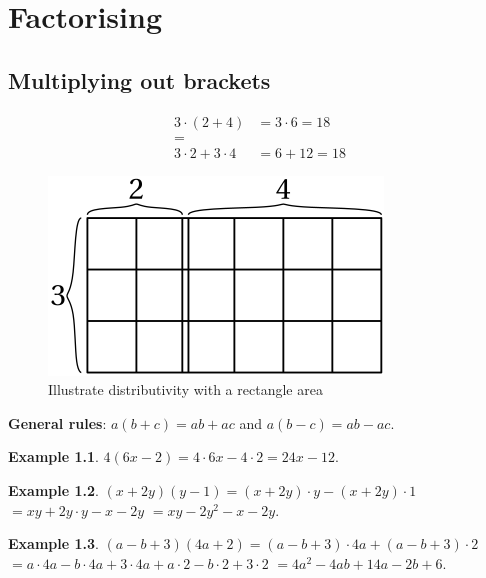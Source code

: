 \documentclass[
  12pt,
  oneside]{book}
\theoremstyle{definition}
\theoremstyle{definition}
\newtheorem{example}{Example}[chapter]
\theoremstyle{definition}
\theoremstyle{definition}
\theoremstyle{remark}
\begin{document}
\hypertarget{factorising}{%
\chapter{Factorising}\label{factorising}}

\hypertarget{multiplying-out-brackets}{%
\section{Multiplying out brackets}\label{multiplying-out-brackets}}

\begin{align*}
3\cdot(2+4) &= 3\cdot 6 = 18\\
=\quad\quad\\
3\cdot2 + 3\cdot 4 &= 6+12 = 18
\end{align*}

\begin{figure}

{\centering \includegraphics{t02-distrib} 

}

\caption{Illustrate distributivity with a rectangle area}\label{fig:unnamed-chunk-12}
\end{figure}

\textbf{General rules}: \(a(b+c)=ab+ac\) and \(a(b-c) = ab-ac\).

\begin{example}
\(4(6x-2)=4\cdot 6x - 4\cdot 2 = 24x-12\).
\end{example}

\begin{example}
\((x+2y)(y-1)=(x+2y)\cdot y - (x+2y)\cdot 1\) \(= xy+2y\cdot y - x -2y\) \(= xy-2y^2-x-2y\).
\end{example}

\begin{example}
\((a-b+3)(4a+2)=(a-b+3)\cdot4a + (a-b+3)\cdot 2\) \(=a\cdot 4a - b\cdot 4a + 3\cdot 4a + a\cdot 2 - b\cdot 2 + 3\cdot 2\) \(= 4a^2 - 4ab + 14a - 2b+6\).
\end{example}
\end{document}
